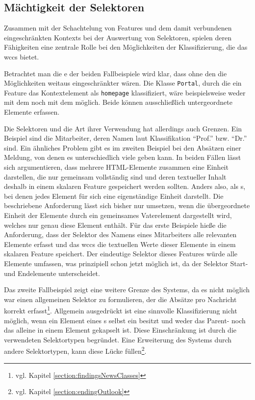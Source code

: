\subsection{Mächtigkeit der Selektoren}
    \label{section:discussionInterpretationSelectors}
    Zusammen mit der Schachtelung von Features und dem
    damit verbundenen eingeschränkten Kontexts bei der
    Auswertung von Selektoren,
    spielen deren Fähigkeiten eine zentrale Rolle bei den
    Möglichkeiten der Klassifizierung, die das \gls{wccs} bietet.

    Betrachtet man die {\classificationModel}e der beiden Fallbeispiele wird klar,
    dass ohne den {\xpathSelector} die Möglichkeiten weitaus eingeschränkter wären.
    Die Klasse \texttt{Portal}, durch die ein Feature das Kontextelement
    als {} \texttt{homepage} klassifiziert,
    wäre beispielsweise weder mit dem {\cssSelector}
    noch mit dem {\urlSelector} möglich.
    Beide können ausschließlich untergeordnete Elemente erfassen.
    
    Die Selektoren und die Art ihrer Verwendung hat allerdings auch Grenzen.
    Ein Beispiel sind die Mitarbeiter, deren Namen laut Klassifikation
    "`Prof."' bzw. "`Dr."' sind.
    Ein ähnliches Problem gibt es im zweiten Beispiel bei den Absätzen einer Meldung,
    von denen es unterschiedlich viele geben kann.
    In beiden Fällen lässt sich argumentieren,
    dass mehrere HTML-Elemente zusammen eine Einheit darstellen,
    die nur gemeinsam vollständig sind und deren textueller Inhalt deshalb
    in einem skalaren Feature gespeichert werden sollten.
    Anders also, als {\collectionFeature}s,
    bei denen jedes Element für sich eine eigenständige Einheit darstellt.
    Die beschriebene Anforderung lässt sich bisher nur umsetzen,
    wenn die übergeordnete Einheit der Elemente durch ein gemeinsames
    Vaterelement dargestellt wird, welches nur genau diese Element enthält.
    Für das erste Beispiele hieße die Anforderung, dass der Selektor des Namens eines Mitarbeiters
    alle relevanten Elemente erfasst und
    das \gls{wccs} die textuellen Werte dieser Elemente
    in einem skalaren Feature speichert.
    Der eindeutige Selektor dieses Features würde alle Elemente umfassen,
    was prinzipiell schon jetzt möglich ist,
    da der Selektor Start- und Endelemente unterscheidet.

    Das zweite Fallbeispiel zeigt eine weitere Grenze des Systems,
    da es nicht möglich war einen allgemeinen Selektor zu formulieren,
    der die Absätze pro Nachricht korrekt
    erfasst\footnote{vgl. Kapitel \ref{section:findingsNewsClasses}}.
    Allgemein ausgedrückt ist eine sinnvolle Klassifizierung nicht möglich,
    wenn ein Element eines {\collectionFeature}s selbst ein {\collectionFeature} besitzt
    und weder das Parent- noch das {\childFeature} alleine in einem Element gekapselt ist.
    Diese Einschränkung ist durch die verwendeten Selektortypen begründet.
    Eine Erweiterung des Systems durch andere Selektortypen, kann diese Lücke
    füllen\footnote{vgl. Kapitel \ref{section:endingOutlook}}.

